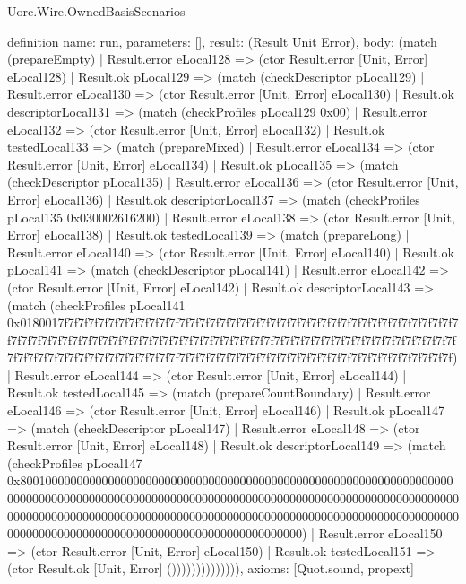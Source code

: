 \begin{lexlean}{Uorc.Wire.OwnedBasisScenarios}
\begin{semanticmodule}
definition{
  name: run,
  parameters: [],
  result: (Result Unit Error),
  body: (match (prepareEmpty)
    | Result.error eLocal128 => (ctor Result.error [Unit, Error] eLocal128)
    | Result.ok pLocal129 => (match (checkDescriptor pLocal129)
      | Result.error eLocal130 => (ctor Result.error [Unit, Error] eLocal130)
      | Result.ok descriptorLocal131 => (match (checkProfiles pLocal129 0x00)
        | Result.error eLocal132 => (ctor Result.error [Unit, Error] eLocal132)
        | Result.ok testedLocal133 => (match (prepareMixed)
          | Result.error eLocal134 => (ctor Result.error [Unit, Error] eLocal134)
          | Result.ok pLocal135 => (match (checkDescriptor pLocal135)
            | Result.error eLocal136 => (ctor Result.error [Unit, Error] eLocal136)
            | Result.ok descriptorLocal137 => (match (checkProfiles pLocal135 0x030002616200)
              | Result.error eLocal138 => (ctor Result.error [Unit, Error] eLocal138)
              | Result.ok testedLocal139 => (match (prepareLong)
                | Result.error eLocal140 => (ctor Result.error [Unit, Error] eLocal140)
                | Result.ok pLocal141 => (match (checkDescriptor pLocal141)
                  | Result.error eLocal142 => (ctor Result.error [Unit, Error] eLocal142)
                  | Result.ok descriptorLocal143 => (match (checkProfiles pLocal141 0x0180017f7f7f7f7f7f7f7f7f7f7f7f7f7f7f7f7f7f7f7f7f7f7f7f7f7f7f7f7f7f7f7f7f7f7f7f7f7f7f7f7f7f7f7f7f7f7f7f7f7f7f7f7f7f7f7f7f7f7f7f7f7f7f7f7f7f7f7f7f7f7f7f7f7f7f7f7f7f7f7f7f7f7f7f7f7f7f7f7f7f7f7f7f7f7f7f7f7f7f7f7f7f7f7f7f7f7f7f7f7f7f7f7f7f7f7f7f7f7f7f7f7f7f7f7f7f7f7f)
                    | Result.error eLocal144 => (ctor Result.error [Unit, Error] eLocal144)
                    | Result.ok testedLocal145 => (match (prepareCountBoundary)
                      | Result.error eLocal146 => (ctor Result.error [Unit, Error] eLocal146)
                      | Result.ok pLocal147 => (match (checkDescriptor pLocal147)
                        | Result.error eLocal148 => (ctor Result.error [Unit, Error] eLocal148)
                        | Result.ok descriptorLocal149 => (match (checkProfiles pLocal147 0x80010000000000000000000000000000000000000000000000000000000000000000000000000000000000000000000000000000000000000000000000000000000000000000000000000000000000000000000000000000000000000000000000000000000000000000000000000000000000000000000000000000000000000000)
                          | Result.error eLocal150 => (ctor Result.error [Unit, Error] eLocal150)
                          | Result.ok testedLocal151 => (ctor Result.ok [Unit, Error] ()))))))))))))),
  axioms: [Quot.sound, propext]
}
\end{semanticmodule}
\end{lexlean}
